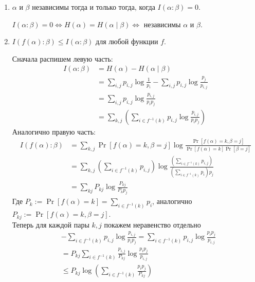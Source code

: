 \begin{prop}
\begin{enumerate}
		\item $  \alpha $ и $  \beta $ независимы тогда и только тогда, когда $ I( \alpha : \beta ) = 0$.
			\begin{proof*}
				$ I( \alpha : \beta ) = 0 \Longleftrightarrow H( \alpha ) = H( \alpha \mid \beta ) \Longleftrightarrow $ независимы $  \alpha $ и $ \beta $.
			\end{proof*}
		\item $ I( f( \alpha ) : \beta ) \le I ( \alpha : \beta )$ для любой функции $ f$.
		\begin{proof*}
	    	Сначала распишем левую часть:
		    \begin{align*}
		        I(\alpha : \beta) &= H(\alpha) - H(\alpha \mid \beta) \\
		        &= \sum_{i,j}p_{i,j}\log\frac{1}{p_i} - \sum_{i,j}p_{i,j}\log\frac{p_j}{p_{i,j}} 
		        \tag{расписали энтропию через вероятности} \\
		        &= \sum_{i,j} p_{i,j}\log\frac{p_{i,j}}{p_i p_j} \\
		        &= \sum_{k,j} \left( \sum_{i\in f^{-1}(k)}p_{i,j}\log\frac{p_{i,j}}{p_i p_j} \right)
		        \tag{сгруппировали с помощью прообразов}
		    \end{align*}
		    Аналогично правую часть:
		    \begin{align*}
		        I(f(\alpha) : \beta) &= \sum_{k, j}\Pr[f(\alpha) = k, \beta = j]\log\frac{\Pr[f(\alpha) = k, \beta = j]}{\Pr[f(\alpha) = k]\Pr[\beta = j]}\\
		        &= \sum_{k,j}\left(\sum_{i \in f^{-1}(k)}p_{i,j}\right)\log\frac{\left(\sum_{i \in f^{-1}(k)}p_{i,j}\right)}{\left(\sum_{i \in f^{-1}(k)}p_{i}\right)p_j} \\
		        &= \sum_{kj} P_{kj} \log \frac{P_{kj}}{P_k p_j}
		    \end{align*}
		    Где $ P_k := \Pr[f(\alpha) = k] = \sum_{i \in f^{-1}(k)} p_i$, аналогично $ P_{kj} := \Pr[f(\alpha) = k, \beta = j]$.\\ 
		    Теперь для каждой пары $k,j$ покажем неравенство отдельно
		    \begin{align*}
		        &- \sum_{i \in f^{-1}(k)} p_{i, j} \log \frac{p_{i, j}}{p_i p_j} 
		        = \sum_{i \in f^{-1}(k)} p_{i, j} \log \frac{p_i p_j}{p_{i, j}} \\
		        &= P_{kj} \sum_{i \in f^{-1}(k)}\frac{p_{i, j}}{P_{kj}} \log \frac{p_i p_j}{p_{i, j}}
		        \tag{поделили и домножили, чтобы сумма коэффициентов была 1}\\
		        &\le P_{kj} \log \left(\sum_{i \in f^{-1}(k)} \frac{p_i p_j}{P_{kj}} \right)

\end{align*}
\end{proof*}
\end{enumerate}
\end{prop}
